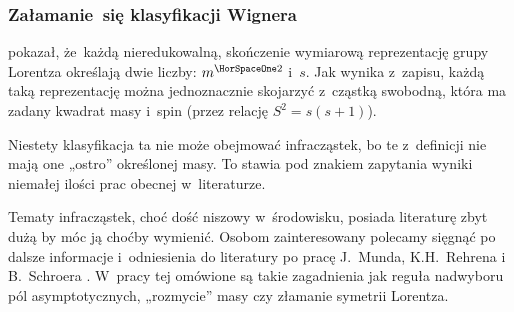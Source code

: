 \documentclass[10pt,t]{beamer}
\begin{document}
\begin{frame}
  \frametitle{Załamanie~się klasyfikacji Wignera}


  pokazał, że~każdą nieredukowalną, skończenie wymiarową reprezentację grupy
  Lorentza określają dwie liczby: $m^{ \HorSpaceOne 2 }$ i~$s$. Jak wynika
  z~zapisu, każdą taką reprezentację można jednoznacznie skojarzyć
  z~cząstką swobodną, która ma zadany kwadrat masy i~spin (przez relację
  $S^{ 2 } = s ( s + 1 )$).

  Niestety klasyfikacja ta \alert{nie} może obejmować infracząstek, bo
  te z~definicji nie mają one „ostro” określonej masy. To stawia pod
  znakiem zapytania wyniki niemałej ilości prac obecnej w~literaturze.

  Tematy infracząstek, choć dość niszowy w~środowisku, posiada literaturę
  zbyt dużą by móc ją choćby wymienić. Osobom zainteresowany polecamy
  sięgnąć po dalsze informacje i~odniesienia do literatury po pracę
  J.~Munda, K.H.~Rehrena i B.~Schroera
  \parencite{Mund-Rehren-Schroer-Infraparticle-quantum-fiels-ETC-Pub-2022}.
  W~pracy tej omówione są takie zagadnienia jak reguła nadwyboru pól
  asymptotycznych, „rozmycie” masy czy złamanie symetrii Lorentza.

\end{frame}
\end{document}
